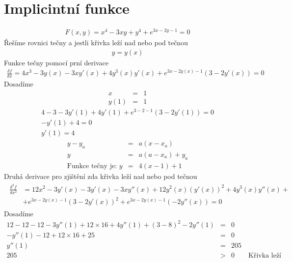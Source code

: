 \documentclass{article}
\begin{document}
\section{Implicintní funkce}
\begin{eqnarray*}
F(x,y)=x^4-3xy+y^4+e^{3x-2y-1}=0
\end{eqnarray*}
Řešíme rovnici tečny a jestli křivka leží nad nebo pod tečnou
\begin{eqnarray*}
y=y(x)
\end{eqnarray*}
Funkce tečny pomocí prní derivace
\begin{eqnarray*}
\frac{\delta f}{\delta x}=4x^3-3y(x)-3xy'(x)+4y^3(x)y'(x)+e^{3x-2y(x)-1}(3-2y'(x))=0
\end{eqnarray*}
Dosadíme
\begin{eqnarray*}
x&=&1\\
y(1)&=&1
\end{eqnarray*}
\begin{eqnarray*}
4-3-3y'(1)+4y'(1)+e^{3-2-1}(3-2y'(1))=0\\
-y'(1)+4=0\\
y'(1)=4
\end{eqnarray*}
\begin{eqnarray*}
y-y_a&=&a(x-x_a)\\
y&=&a(a-x_a)+y_a\\
\text{Funkce tečny je: }y&=&4(x-1)+1
\end{eqnarray*}
Druhá derivace pro zjištění zda křivka leží nad nebo pod tečnou
\begin{eqnarray*}
\begin{split}
\frac{\delta^2 f}{\delta x^2}&=12x^2-3y'(x)-3y'(x)-3xy''(x)+12y^2(x)(y'(x))^2+4y^3(x)y''(x)+\\
&+e^{3x-2y(x)-1}(3-2y'(x))^2+e^{3x-2y(x)-1}(-2y''(x))=0
\end{split}
\end{eqnarray*}
Dosadíme
\begin{eqnarray*}
12-12-12-3y''(1)+12\times16+4y''(1)+(3-8)^2-2y''(1)&=&0\\
-y''(1)-12+12 \times16+25&=&0\\
y''(1)&=&205\\
205&>&0 \qquad\text{Křivka leží nad tečnou}\\
\end{eqnarray*}
\end{document}
